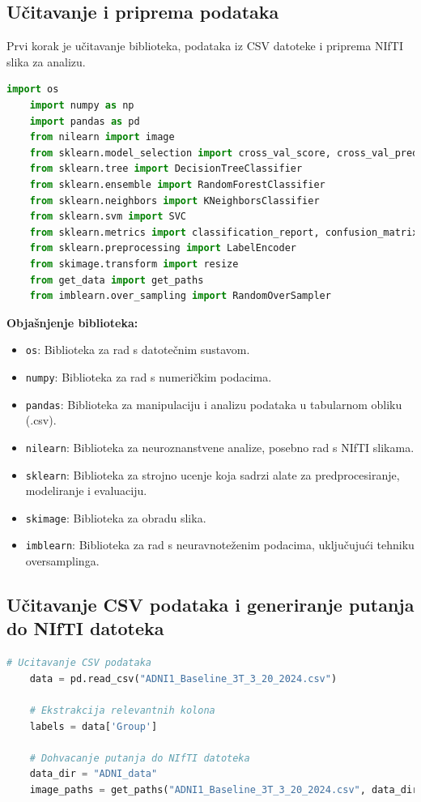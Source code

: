 \documentclass[zavrsnirad]{fer}
\begin{document}
\subsection{Učitavanje i priprema podataka}
Prvi korak je učitavanje biblioteka, podataka iz CSV datoteke i priprema NIfTI slika za analizu.

\begin{lstlisting}[language=Python, caption={Učitavanje Python biblioteka}]
	import os
	import numpy as np
	import pandas as pd
	from nilearn import image
	from sklearn.model_selection import cross_val_score, cross_val_predict
	from sklearn.tree import DecisionTreeClassifier
	from sklearn.ensemble import RandomForestClassifier
	from sklearn.neighbors import KNeighborsClassifier
	from sklearn.svm import SVC
	from sklearn.metrics import classification_report, confusion_matrix
	from sklearn.preprocessing import LabelEncoder
	from skimage.transform import resize
	from get_data import get_paths
	from imblearn.over_sampling import RandomOverSampler
\end{lstlisting}

\noindent \textbf{Objašnjenje biblioteka:}
\begin{itemize}
	\item \texttt{os}: Biblioteka za rad s datotečnim sustavom.
	\item \texttt{numpy}: Biblioteka za rad s numeričkim podacima.
	\item \texttt{pandas}: Biblioteka za manipulaciju i analizu podataka u tabularnom obliku (.csv).
	\item \texttt{nilearn}: Biblioteka za neuroznanstvene analize, posebno rad s NIfTI slikama.
	\item \texttt{sklearn}: Biblioteka za strojno ucenje koja sadrzi alate za predprocesiranje, modeliranje i evaluaciju.
	\item \texttt{skimage}: Biblioteka za obradu slika.
	\item \texttt{imblearn}: Biblioteka za rad s neuravnoteženim podacima, uključujući tehniku oversamplinga.
\end{itemize}

\subsection{Učitavanje CSV podataka i generiranje putanja do NIfTI datoteka}

\begin{lstlisting}[language=Python, caption={Učitavanje podataka i generiranje putanja}]
	# Ucitavanje CSV podataka
	data = pd.read_csv("ADNI1_Baseline_3T_3_20_2024.csv")
	
	# Ekstrakcija relevantnih kolona
	labels = data['Group']
	
	# Dohvacanje putanja do NIfTI datoteka
	data_dir = "ADNI_data"
	image_paths = get_paths("ADNI1_Baseline_3T_3_20_2024.csv", data_dir)
\end{lstlisting}
\end{document}
